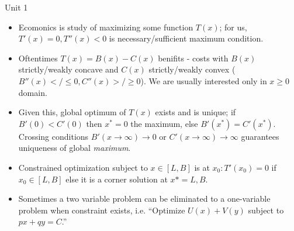 \documentclass[10pt,twocolumn]{article}
\begin{document}

Unit 1
\begin{itemize}
    \item Ecomonics is study of maximizing some function $T(x)$; for us, $T'(x) = 0, T''(x) < 0$ is necessary/sufficient maximum condition. 
    \item Oftentimes $T(x) = B(x) - C(x)$ benifits - costs with $B(x)$ strictly/weakly concave and $C(x)$ strictly/weakly convex ($B''(x) </\leq 0, C''(x) >/\geq 0$). We are usually interested only in $x \geq 0$ domain.
    \item Given this, global optimum of $T(x)$ exists and is unique; if $B'(0) < C'(0)$ then $x^* = 0$ the maximum, else $B'(x^*) = C'(x^*)$. Crossing conditions $B'(x \to \infty) \to 0$ or $C'(x \to \infty) \to \infty$ guarantees uniqueness of global \emph{maximum}.
    \item Constrained optimization subject to $x \in [L,B]$ is at $x_0: T'(x_0) = 0$ if $x_0 \in [L,B]$ else it is a corner solution at $x* = L,B$.
    \item Sometimes a two variable problem can be eliminated to a one-variable problem when constraint exists, i.e. ``Optimize $U(x) + V(y)$ subject to $px + qy = C$.''
\end{itemize}
\end{document}
